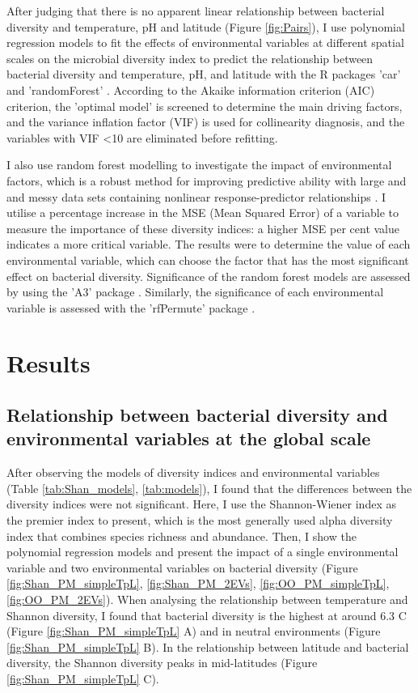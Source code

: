 \documentclass[11pt, a4paper]{article}
\begin{document}
\begin{spacing}{1.5}
After judging that there is no apparent linear relationship between bacterial diversity and temperature, pH and latitude (Figure \ref{fig:Pairs}), I use polynomial regression models to fit the effects of environmental variables at different spatial scales on the microbial diversity index to predict the relationship between bacterial diversity and temperature, pH, and latitude with the R packages 'car' \citep{fox2012package} and 'randomForest' \citep{rcolorbrewer2018package}. According to the Akaike information criterion (AIC) criterion, the 'optimal model' is screened to determine the main driving factors, and the variance inflation factor (VIF) is used for collinearity diagnosis, and the variables with VIF \textless 10 are eliminated before refitting. 

I also use random forest modelling to investigate the impact of environmental factors, which is a robust method for improving predictive ability with large and and messy data sets containing nonlinear response-predictor relationships \citep{breiman2001random, cutler2007random}.  I utilise a percentage increase in the MSE (Mean Squared Error) of a variable to measure the importance of these diversity indices: a higher MSE per cent value indicates a more critical variable. The results were to determine the value of each environmental variable, which can choose the factor that has the most significant effect on bacterial diversity. Significance of the random forest models are assessed by using the 'A3' package \citep{fortmann2015package}. Similarly, the significance of each environmental variable is assessed with the 'rfPermute' package \citep{archer2016package}.

\section{Results}

\subsection{Relationship between bacterial diversity and environmental variables at the global scale}

After observing the models of diversity indices and environmental variables (Table \ref{tab:Shan_models}, \ref{tab:models}), I found that the differences between the diversity indices were not significant. Here, I use the Shannon-Wiener index as the premier index to present, which is the most generally used alpha diversity index that combines species richness and abundance. Then, I show the polynomial regression models and present the impact of a single environmental variable and two environmental variables on bacterial diversity (Figure \ref{fig:Shan_PM_simpleTpL}, \ref{fig:Shan_PM_2EVs}, \ref{fig:OO_PM_simpleTpL}, \ref{fig:OO_PM_2EVs}). When analysing the relationship between temperature and Shannon diversity, I found that bacterial diversity is the highest at around 6.3 \textdegree C (Figure \ref{fig:Shan_PM_simpleTpL} A) and in neutral environments (Figure \ref{fig:Shan_PM_simpleTpL} B). In the relationship between latitude and bacterial diversity, the Shannon diversity peaks in mid-latitudes (Figure \ref{fig:Shan_PM_simpleTpL} C). 



\end{spacing}
\end{document}
